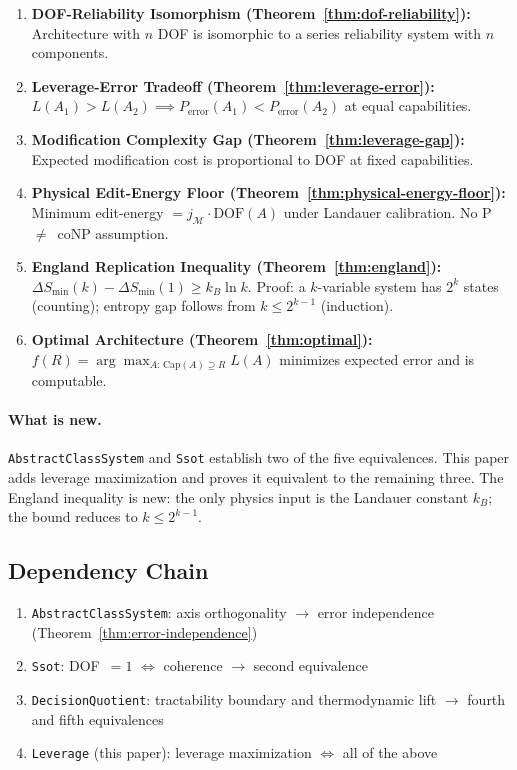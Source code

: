 \begin{enumerate}
\item \textbf{DOF-Reliability Isomorphism (Theorem~\ref{thm:dof-reliability}):} Architecture with $n$ DOF is isomorphic to a series reliability system with $n$ components.

\item \textbf{Leverage-Error Tradeoff (Theorem~\ref{thm:leverage-error}):} $L(A_1) > L(A_2) \implies P_{\mathrm{error}}(A_1) < P_{\mathrm{error}}(A_2)$ at equal capabilities.

\item \textbf{Modification Complexity Gap (Theorem~\ref{thm:leverage-gap}):} Expected modification cost is proportional to DOF at fixed capabilities.

\item \textbf{Physical Edit-Energy Floor (Theorem~\ref{thm:physical-energy-floor}):} Minimum edit-energy $= j_\mathcal{M} \cdot \mathrm{DOF}(A)$ under Landauer calibration. No P~$\neq$~coNP assumption. 

\item \textbf{England Replication Inequality (Theorem~\ref{thm:england}):} $\Delta S_{\min}(k) - \Delta S_{\min}(1) \geq k_B \ln k$. Proof: a $k$-variable system has $2^k$ states (counting); entropy gap follows from $k \leq 2^{k-1}$ (induction). 

\item \textbf{Optimal Architecture (Theorem~\ref{thm:optimal}):} $f(R) = \arg\max_{A:\,\mathrm{Cap}(A) \supseteq R} L(A)$ minimizes expected error and is computable.
\end{enumerate}

\paragraph{What is new.} \texttt{AbstractClassSystem} and \texttt{Ssot} establish two of the five equivalences. This paper adds leverage maximization and proves it equivalent to the remaining three. The England inequality is new: the only physics input is the Landauer constant $k_B$; the bound reduces to $k \leq 2^{k-1}$.

\subsection{Dependency Chain}

\begin{enumerate}
\item \texttt{AbstractClassSystem}: axis orthogonality $\to$ error independence (Theorem~\ref{thm:error-independence})
\item \texttt{Ssot}: DOF~$= 1$ $\iff$ coherence $\to$ second equivalence
\item \texttt{DecisionQuotient}: tractability boundary and thermodynamic lift $\to$ fourth and fifth equivalences
\item \texttt{Leverage} (this paper): leverage maximization $\iff$ all of the above
\end{enumerate}

